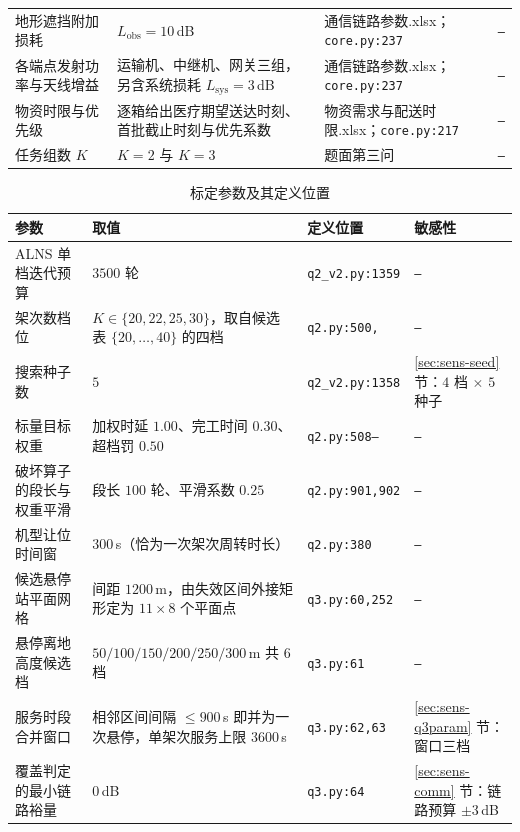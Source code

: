 \begin{table}[htbp]
\begin{tabularx}{\textwidth}{@{}>{\hsize=1.00\hsize}X >{\hsize=1.40\hsize}X >{\hsize=1.05\hsize}X >{\hsize=0.55\hsize}X@{}}
		地形遮挡附加损耗 & $L_{\mathrm{obs}}=10$\,dB & 通信链路参数.xlsx；\texttt{core.py:237} & \texttt{---} \\
		各端点发射功率与天线增益 & 运输机、中继机、网关三组，另含系统损耗 $L_{\mathrm{sys}}=3$\,dB & 通信链路参数.xlsx；\texttt{core.py:237} & \texttt{---} \\
		物资时限与优先级 & 逐箱给出医疗期望送达时刻、首批截止时刻与优先系数 & 物资需求与配送时限.xlsx；\texttt{core.py:217} & \texttt{---} \\
		任务组数 $K$ & $K=2$ 与 $K=3$ & 题面第三问 & \texttt{---} \\
		\bottomrule
	\end{tabularx}
\end{table}

\begin{table}[htbp]
	\caption{标定参数及其定义位置}
	\label{tab:param-calib}
	\centering
	\small
	\begin{tabularx}{\textwidth}{@{}>{\hsize=1.00\hsize}X >{\hsize=1.40\hsize}X >{\hsize=1.05\hsize}X >{\hsize=0.55\hsize}X@{}}
		\toprule
		参数 & 取值 & 定义位置 & 敏感性 \\
		\midrule
		ALNS 单档迭代预算 & $3500$ 轮 & \texttt{q2\_v2.py:1359} & \texttt{---} \\
		架次数档位 & $K\in\{20,22,25,30\}$，取自候选表 $\{20,\dots,40\}$ 的四档 & \texttt{q2.py:500,\allowbreak 1325} & \texttt{---} \\
		搜索种子数 & $5$ & \texttt{q2\_v2.py:1358} & \ref{sec:sens-seed} 节：$4$ 档 $\times$ $5$ 种子 \\
		标量目标权重 & 加权时延 $1.00$、完工时间 $0.30$、超档罚 $0.50$ & \texttt{q2.py:508--\allowbreak 510} & \texttt{---} \\
		破坏算子的段长与权重平滑 & 段长 $100$ 轮、平滑系数 $0.25$ & \texttt{q2.py:901,902} & \texttt{---} \\
		机型让位时间窗 & $300$\,s（恰为一次架次周转时长） & \texttt{q2.py:380} & \texttt{---} \\
		候选悬停站平面网格 & 间距 $1200$\,m，由失效区间外接矩形定为 $11\times8$ 个平面点 & \texttt{q3.py:60,252} & \texttt{---} \\
		悬停离地高度候选档 & $50/100/150/200/250/300$\,m 共 $6$ 档 & \texttt{q3.py:61} & \texttt{---} \\
		服务时段合并窗口 & 相邻区间间隔 $\le900$\,s 即并为一次悬停，单架次服务上限 $3600$\,s & \texttt{q3.py:62,63} & \ref{sec:sens-q3param} 节：窗口三档 \\
		覆盖判定的最小链路裕量 & $0$\,dB & \texttt{q3.py:64} & \ref{sec:sens-comm} 节：链路预算 $\pm3$\,dB \\

\end{tabularx}
\end{table}
